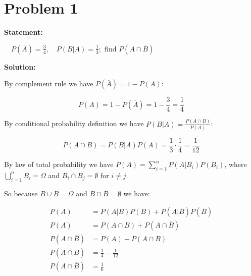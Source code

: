 \section*{Problem 1}

\textbf{Statement:}

$\quad P(\overline{A}) = \frac{3}{4}, \quad P(B|A) = \frac{1}{3}; \text{ find } P(A\cap\overline{B})$

\noindent\textbf{Solution:}

By complement rule we have $P(\overline{A}) = 1 - P(A)$:

\begin{equation*}
    P(A) = 1 - P(\overline{A}) = 1 - \frac{3}{4} = \frac{1}{4}
\end{equation*}

By conditional probability definition we have $P(B|A) = \frac{P(A\cap B)}{P(A)}$:

\begin{equation*}
    P(A\cap B) = P(B|A)P(A) = \frac{1}{3} \cdot \frac{1}{4} = \frac{1}{12}
\end{equation*}

By law of total probability we have $P(A) = \sum_{i=1}^n P(A|B_i)P(B_i)$, where
$\bigcup_{i=1}^n B_i = \Omega$ and $B_i \cap B_j = \emptyset$ for $i \neq j$.

So because $B \cup \overline{B} = \Omega$ and $B \cap \overline{B} = \emptyset$ we have:

\begin{equation*}
    \begin{split}
        P(A)                 & = P(A|B)P(B) + P(A|\overline{B})P(\overline{B}) \\
        P(A)                 & = P(A\cap B) + P(A\cap\overline{B})             \\
        P(A\cap\overline{B}) & = P(A) - P(A\cap B)                             \\
        P(A\cap\overline{B}) & = \frac{1}{4} - \frac{1}{12}                    \\
        P(A\cap\overline{B}) & = \frac{1}{6}
    \end{split}
\end{equation*}